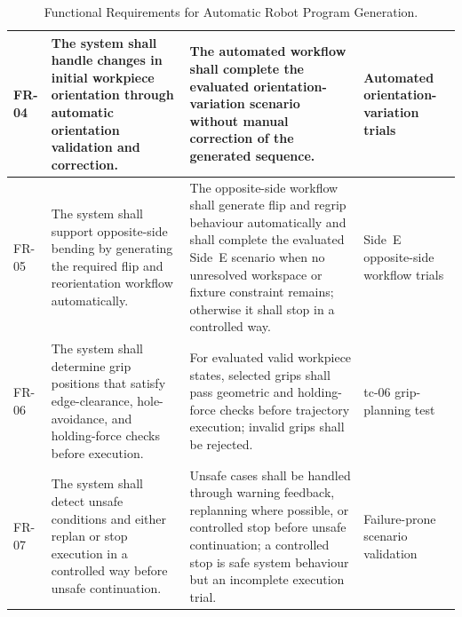 \begin{table}
\begin{tabularx}{\textheight}{
L{1.3cm}
L{8.0cm}
L{8.8cm}
L{4.0cm}
}
\hline

FR-04 &
The system shall handle changes in initial workpiece orientation through automatic orientation validation and correction. &
The automated workflow shall complete the evaluated orientation-variation scenario without manual correction of the generated sequence. &
Automated orientation-variation trials \\

\hline

FR-05 &
The system shall support opposite-side bending by generating the required flip and reorientation workflow automatically. &
The opposite-side workflow shall generate flip and regrip behaviour automatically and shall complete the evaluated Side~E scenario when no unresolved workspace or fixture constraint remains; otherwise it shall stop in a controlled way. &
Side~E opposite-side workflow trials \\

\hline

FR-06 &
The system shall determine grip positions that satisfy edge-clearance, hole-avoidance, and holding-force checks before execution. &
For evaluated valid workpiece states, selected grips shall pass geometric and holding-force checks before trajectory execution; invalid grips shall be rejected. &
\acs{tc}-06 grip-planning test \\

\hline

FR-07 &
The system shall detect unsafe conditions and either replan or stop execution in a controlled way before unsafe continuation. &
Unsafe cases shall be handled through warning feedback, replanning where possible, or controlled stop before unsafe continuation; a controlled stop is safe system behaviour but an incomplete execution trial. &
Failure-prone scenario validation \\

\hline
\end{tabularx}
\caption{Functional Requirements for Automatic Robot Program Generation.}
\label{tab:functional-requirements}
\end{table}
